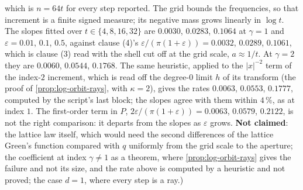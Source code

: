 \begin{proposition}
{which is $n = 64t$ for every step reported. The grid bounds the
frequencies, so that increment is a finite signed measure; its negative mass grows linearly in
$\log t$. The slopes fitted over $t \in \{4, 8, 16, 32\}$ are $0.0030$, $0.0283$, $0.1064$ at
$\gamma = 1$ and $\varepsilon = 0.01$, $0.1$, $0.5$, against clause (4)'s
$\varepsilon/(\pi(1+\varepsilon)) = 0.0032$, $0.0289$, $0.1061$, which is clause (3) read with the
shell cut off at the grid scale, $a \approx 1/t$. At $\gamma = 2$ they are $0.0060$, $0.0544$,
$0.1768$. The same heuristic, applied to the $|x|^{-2}$ term of the index-$2$ increment, which is read
off the degree-$0$ limit $h$ of its transform (the proof of \ref{prop:log-orbit-rays}, with $\kappa = 2$),
gives the rates $0.0063$, $0.0553$, $0.1777$, computed by the script's last block; the slopes agree with
them within $4\,\%$, as at index $1$. The first-order term in $P$, $2\varepsilon/(\pi(1+\varepsilon)) =
0.0063$, $0.0579$, $0.2122$, is not the right comparison: it departs from the slopes as $\varepsilon$
grows. \textbf{Not claimed}: the lattice law itself, which would need the second differences of the
lattice Green's function compared with $q$ uniformly from the grid scale to the aperture; the
coefficient at index $\gamma \ne 1$ as a theorem, where \ref{prop:log-orbit-rays} gives the failure and
not its size, and the rate above is computed by a heuristic and not proved; the case $d = 1$, where
every step is a ray.)}
\end{proposition}

